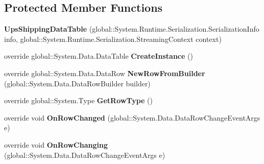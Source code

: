 \subsection*{Protected Member Functions}
\begin{DoxyCompactItemize}
\item 
{\bfseries Ups\+Shipping\+Data\+Table} (global\+::\+System.\+Runtime.\+Serialization.\+Serialization\+Info info, global\+::\+System.\+Runtime.\+Serialization.\+Streaming\+Context context)\hypertarget{class_products_1_1_data_1_1ds_sage_1_1_ups_shipping_data_table_a894fb35e363f586c91fbfdbca2020ac3}{}\label{class_products_1_1_data_1_1ds_sage_1_1_ups_shipping_data_table_a894fb35e363f586c91fbfdbca2020ac3}

\item 
override global\+::\+System.\+Data.\+Data\+Table {\bfseries Create\+Instance} ()\hypertarget{class_products_1_1_data_1_1ds_sage_1_1_ups_shipping_data_table_a5cea9449d6557255e13d0c4ce2469edd}{}\label{class_products_1_1_data_1_1ds_sage_1_1_ups_shipping_data_table_a5cea9449d6557255e13d0c4ce2469edd}

\item 
override global\+::\+System.\+Data.\+Data\+Row {\bfseries New\+Row\+From\+Builder} (global\+::\+System.\+Data.\+Data\+Row\+Builder builder)\hypertarget{class_products_1_1_data_1_1ds_sage_1_1_ups_shipping_data_table_a4d401da16fb44ac532bf8d7c79b34716}{}\label{class_products_1_1_data_1_1ds_sage_1_1_ups_shipping_data_table_a4d401da16fb44ac532bf8d7c79b34716}

\item 
override global\+::\+System.\+Type {\bfseries Get\+Row\+Type} ()\hypertarget{class_products_1_1_data_1_1ds_sage_1_1_ups_shipping_data_table_a4d0dc2a6bcabebd31b411095c89d9c5b}{}\label{class_products_1_1_data_1_1ds_sage_1_1_ups_shipping_data_table_a4d0dc2a6bcabebd31b411095c89d9c5b}

\item 
override void {\bfseries On\+Row\+Changed} (global\+::\+System.\+Data.\+Data\+Row\+Change\+Event\+Args e)\hypertarget{class_products_1_1_data_1_1ds_sage_1_1_ups_shipping_data_table_afba94d6b07bf3c5c3bf5b8524045fc1b}{}\label{class_products_1_1_data_1_1ds_sage_1_1_ups_shipping_data_table_afba94d6b07bf3c5c3bf5b8524045fc1b}

\item 
override void {\bfseries On\+Row\+Changing} (global\+::\+System.\+Data.\+Data\+Row\+Change\+Event\+Args e)\hypertarget{class_products_1_1_data_1_1ds_sage_1_1_ups_shipping_data_table_a79dcfef2d0af31ef0ecb6690bf707637}{}\label{class_products_1_1_data_1_1ds_sage_1_1_ups_shipping_data_table_a79dcfef2d0af31ef0ecb6690bf707637}


\end{DoxyCompactItemize}
